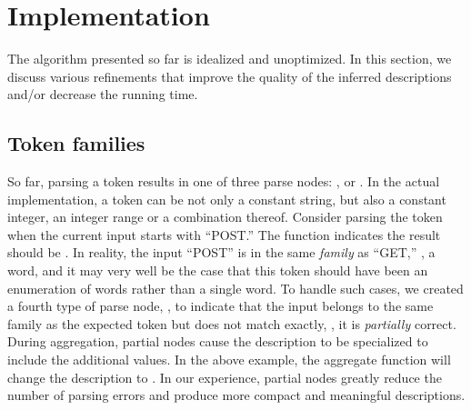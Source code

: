 \section{Implementation}
\label{sec:imp}
The algorithm presented so far is idealized and unoptimized.
In this section, we discuss various refinements that improve the 
quality of the inferred descriptions and/or decrease the running time.

\subsection{Token families}
So far, parsing a  token results
in one of three parse nodes: ,  or . 
In the actual implementation, a  token can be not only a constant string, but also
a constant integer, an integer range or a combination thereof.
Consider parsing the token  when
the current input starts with ``POST.'' The
 function indicates the result should be .
In reality, the input ``POST'' is in the same {\em family} as ``GET,'' 
\ie{}, a word,
and it may very well be the case that this  token should have been 
an enumeration of words rather than a single word.
To handle such cases, we created a fourth type of parse node, , 
to indicate that the input belongs to the same family as the expected
token but does not match exactly, \ie, it is {\em partially} correct.
During aggregation, partial nodes cause the description 
to be specialized to include the additional values.  In the above example, the aggregate 
function will change the description to .
In our experience, partial nodes greatly reduce the number of parsing errors
and produce more compact and meaningful descriptions.


